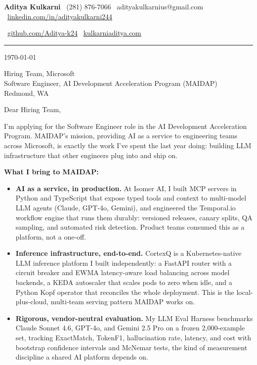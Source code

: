 \documentclass[11pt]{article}
\begin{document}
{\large\textbf{Aditya Kulkarni}} \hfill
{\small
  \textcolor{accent}{\faPhone}\ (281) 876-7066 \quad
  \textcolor{accent}{\faEnvelope}\ adityakulkarnius@gmail.com \quad
  \textcolor{accent}{\faLinkedin}\ \href{https://linkedin.com/in/adityakulkarni244}{linkedin.com/in/adityakulkarni244}
}

{\small
  \textcolor{accent}{\faGithub}\ \href{https://github.com/Aditya-k24}{github.com/Aditya-k24} \quad
  \textcolor{accent}{\faGlobe}\ \href{https://kulkarniaditya.com}{kulkarniaditya.com}
}

\vspace{4pt}
\textcolor{accent}{\rule{\linewidth}{0.5pt}}
\vspace{8pt}

\today

\vspace{8pt}
Hiring Team, Microsoft\\
Software Engineer, AI Development Acceleration Program (MAIDAP)\\
Redmond, WA

\vspace{10pt}
Dear Hiring Team,

\vspace{8pt}
I'm applying for the Software Engineer role in the AI Development Acceleration Program. MAIDAP's mission, providing AI as a service to engineering teams across Microsoft, is exactly the work I've spent the last year doing: building LLM infrastructure that other engineers plug into and ship on.

\vspace{8pt}
\textbf{What I bring to MAIDAP:}

\begin{itemize}[leftmargin=*, label={\textcolor{accent}{\faAngleRight}}, itemsep=4pt]
  \item \textbf{AI as a service, in production.} At Isomer AI, I built MCP servers in Python and TypeScript that expose typed tools and context to multi-model LLM agents (Claude, GPT-4o, Gemini), and engineered the Temporal.io workflow engine that runs them durably: versioned releases, canary splits, QA sampling, and automated risk detection. Product teams consumed this as a platform, not a one-off.

  \item \textbf{Inference infrastructure, end-to-end.} CortexQ is a Kubernetes-native LLM inference platform I built independently: a FastAPI router with a circuit breaker and EWMA latency-aware load balancing across model backends, a KEDA autoscaler that scales pods to zero when idle, and a Python Kopf operator that reconciles the whole deployment. This is the local-plus-cloud, multi-team serving pattern MAIDAP works on.

  \item \textbf{Rigorous, vendor-neutral evaluation.} My LLM Eval Harness benchmarks Claude Sonnet 4.6, GPT-4o, and Gemini 2.5 Pro on a frozen 2,000-example set, tracking ExactMatch, TokenF1, hallucination rate, latency, and cost with bootstrap confidence intervals and McNemar tests, the kind of measurement discipline a shared AI platform depends on.
\end{itemize}
\end{document}
